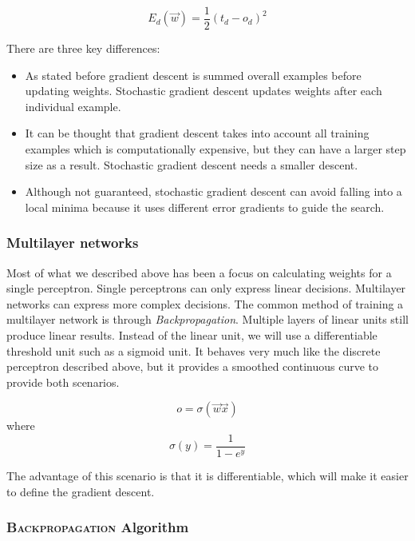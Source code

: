 \documentclass[11pt]{article}
\begin{document}
\begin{equation}
E_d(\vec{w})=\frac{1}{2} (t_d - o_d)^2
\end{equation}

There are three key differences:

\begin{itemize}
\item As stated before gradient descent is summed overall examples before updating weights. Stochastic gradient descent updates weights after each individual example.
\item It can be thought that gradient descent takes into account all training examples which is computationally expensive, but they can have a larger step size as a result. Stochastic gradient descent needs a smaller descent.
\item Although not guaranteed, stochastic gradient descent can avoid falling into a local minima because it uses different error gradients to guide the search.
\end{itemize}

\subsubsection{Multilayer networks}

Most of what we described above has been a focus on calculating weights for a single perceptron. Single perceptrons can only express linear decisions. Multilayer networks can express more complex decisions. The common method of training a multilayer network is through \textit{Backpropagation}. Multiple layers of linear units still produce linear results. Instead of the linear unit, we will use a differentiable threshold unit such as a sigmoid unit. It behaves very much like the discrete perceptron described above, but it provides a smoothed continuous curve to provide both scenarios.

\begin{equation}
o = \sigma (\vec{w} \vec{x})
\end{equation}
where
\begin{equation}
\sigma(y) = \frac{1}{1-e^y}
\end{equation}

The advantage of this scenario is that it is differentiable, which will make it easier to define the gradient descent.

\subsubsection*{\textsc{Backpropagation} Algorithm}
\end{document}
